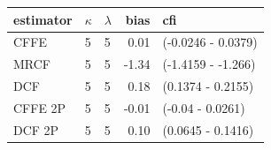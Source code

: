 \begin{tabular}{lllrl}
  \hline
estimator & $\kappa$ & $\lambda$ & bias & cfi \\ 
  \hline
CFFE  & 5 & 5 & 0.01 & (-0.0246 - 0.0379) \\ 
  MRCF  & 5 & 5 & -1.34 & (-1.4159 - -1.266) \\ 
  DCF  & 5 & 5 & 0.18 & (0.1374 - 0.2155) \\ 
  CFFE 2P  & 5 & 5 & -0.01 & (-0.04 - 0.0261) \\ 
  DCF 2P  & 5 & 5 & 0.10 & (0.0645 - 0.1416) \\ 
   \hline
\end{tabular}
